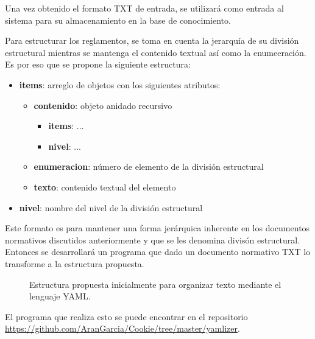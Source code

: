 Una vez obtenido el formato TXT de entrada, se utilizará como entrada al sistema para su almacenamiento en la base de conocimiento.

Para estructurar los reglamentos, se toma en cuenta la jerarquía de su división estructural mientras se mantenga el contenido textual así como la enumeeración. Es por eso que se propone la siguiente estructura:

\begin{itemize}
    \item \textbf{items}: arreglo de objetos con los siguientes atributos:
    
    \begin{itemize}
        \item \textbf{contenido}: objeto anidado recursivo
        
        \begin{itemize}
            \item \textbf{items}: ...
            \item \textbf{nivel}: ...
        \end{itemize}
        
        \item \textbf{enumeracion}: número de elemento de la división estructural
        \item \textbf{texto}: contenido textual del elemento
    \end{itemize}
    
    \item \textbf{nivel}: nombre del nivel de la división estructural
\end{itemize}

Este formato es para mantener una forma jerárquica inherente en los documentos normativos discutidos anteriormente y que se les denomina divisón estructural. Entonces se desarrollará un programa que dado un documento normativo TXT lo transforme a la estructura propuesta.

\begin{figure}
    \centering
    
    \caption{Estructura propuesta inicialmente para organizar texto mediante el lenguaje YAML.}
    \label{fig:estructura_propuesta}
\end{figure}

El programa que realiza esto se puede encontrar en el repositorio \url{https://github.com/AranGarcia/Cookie/tree/master/yamlizer}.